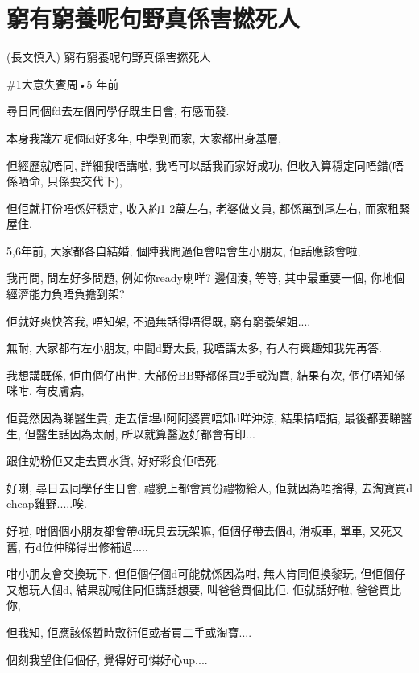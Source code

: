\chapter{窮有窮養呢句野真係害撚死人}

(長文慎入) 窮有窮養呢句野真係害撚死人

\#1大意失賓周•5 年前

尋日同個fd去左個同學仔既生日會, 有感而發.

本身我識左呢個fd好多年, 中學到而家, 大家都出身基層,

但經歷就唔同, 詳細我唔講啦, 我唔可以話我而家好成功, 但收入算穏定同唔錯(唔係哂命, 只係要交代下),

但佢就打份唔係好穏定, 收入約1-2萬左右, 老婆做文員, 都係萬到尾左右, 而家租緊屋住.

5,6年前, 大家都各自結婚, 個陣我問過佢會唔會生小朋友, 佢話應該會啦,

我再問, 問左好多問題, 例如你ready喇咩? 邊個湊, 等等, 其中最重要一個, 你地個經濟能力負唔負擔到架?

佢就好爽快答我, 唔知架, 不過無話得唔得既, 窮有窮養架姐....

無耐, 大家都有左小朋友, 中間d野太長, 我唔講太多, 有人有興趣知我先再答.

我想講既係, 佢由個仔出世, 大部份BB野都係買2手或淘寶, 結果有次, 個仔唔知係咪咁, 有皮膚病,

佢竟然因為睇醫生貴, 走去信埋d阿阿婆買唔知d咩沖涼, 結果搞唔掂, 最後都要睇醫生, 但醫生話因為太耐, 所以就算醫返好都會有印...

跟住奶粉佢又走去買水貨, 好好彩食佢唔死.

好喇, 尋日去同學仔生日會, 禮貌上都會買份禮物給人, 佢就因為唔捨得, 去淘寶買d cheap雞野.....唉.

好啦, 咁個個小朋友都會帶d玩具去玩架嘛, 佢個仔帶去個d, 滑板車, 單車, 又死又舊, 有d位仲睇得出修補過.....

咁小朋友會交換玩下, 但佢個仔個d可能就係因為咁, 無人肯同佢換黎玩, 但佢個仔又想玩人個d, 結果就喊住同佢講話想要, 叫爸爸買個比佢, 佢就話好啦, 爸爸買比你,

但我知, 佢應該係暫時敷衍佢或者買二手或淘寶....

個刻我望住佢個仔, 覺得好可憐好心up....

